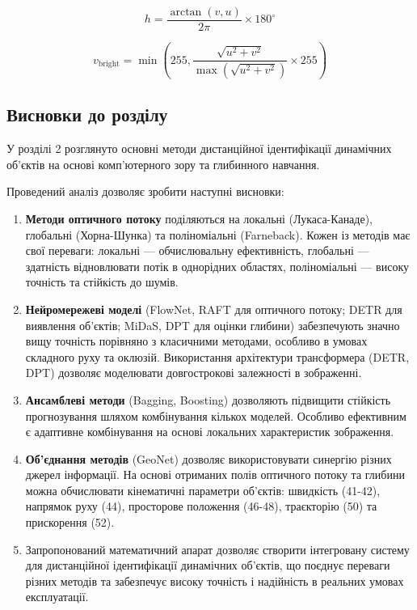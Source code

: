 \documentclass[14pt, a4paper]{extarticle}
\numberwithin{equation}{section}
\begin{document}
\begin{equation}
h = \frac{\arctan(v, u)}{2\pi} \times 180^\circ \tag{79}
\end{equation}

\begin{equation}
v_{\text{bright}} = \min\left(255, \frac{\sqrt{u^2 + v^2}}{\max(\sqrt{u^2 + v^2})} \times 255\right) \tag{81}
\end{equation}

\subsection{Висновки до розділу}

У розділі 2 розглянуто основні методи дистанційної ідентифікації динамічних об'єктів на основі комп'ютерного зору та глибинного навчання.

Проведений аналіз дозволяє зробити наступні висновки:

\begin{enumerate}
    \item \textbf{Методи оптичного потоку} поділяються на локальні (Лукаса-Канаде), глобальні (Хорна-Шунка) та поліноміальні (Farneback). Кожен із методів має свої переваги: локальні — обчислювальну ефективність, глобальні — здатність відновлювати потік в однорідних областях, поліноміальні — високу точність та стійкість до шумів.
    
    \item \textbf{Нейромережеві моделі} (FlowNet, RAFT для оптичного потоку; DETR для виявлення об'єктів; MiDaS, DPT для оцінки глибини) забезпечують значно вищу точність порівняно з класичними методами, особливо в умовах складного руху та оклюзій. Використання архітектури трансформера (DETR, DPT) дозволяє моделювати довгострокові залежності в зображенні.
    
    \item \textbf{Ансамблеві методи} (Bagging, Boosting) дозволяють підвищити стійкість прогнозування шляхом комбінування кількох моделей. Особливо ефективним є адаптивне комбінування на основі локальних характеристик зображення.
    
    \item \textbf{Об'єднання методів} (GeoNet) дозволяє використовувати синергію різних джерел інформації. На основі отриманих полів оптичного потоку та глибини можна обчислювати кінематичні параметри об'єктів: швидкість (41-42), напрямок руху (44), просторове положення (46-48), траєкторію (50) та прискорення (52).
    
    \item Запропонований математичний апарат дозволяє створити інтегровану систему для дистанційної ідентифікації динамічних об'єктів, що поєднує переваги різних методів та забезпечує високу точність і надійність в реальних умовах експлуатації.
\end{enumerate}
\end{document}
